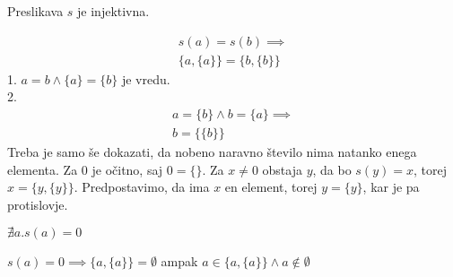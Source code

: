 \begin{trditev}
    Preslikava $s$ je injektivna.
\end{trditev}
\begin{dokaz}
    \begin{align*}
        s(a) = s(b) \implies \\
        \{a,\{a\}\} = \{b,\{b\}\}
    \end{align*}
    1. $a = b \wedge \{a\} = \{b\}$ je vredu. \\
    2.
    \begin{align*}
        a = \{b\} \wedge b = \{a\} \implies \\
        b = \{\{b\}\}
    \end{align*}
    Treba je samo še dokazati, da nobeno naravno število nima natanko enega elementa.
    Za $0$ je očitno, saj $0 = \{\}$.
    Za $x \neq 0$ obstaja $y$, da bo $s(y) = x$, torej $x = \{y, \{y\}\}$.
    Predpostavimo, da ima $x$ en element, torej $y = \{y\}$, kar je pa protislovje.
\end{dokaz}

\begin{trditev}
    $\nexists a. s(a) = 0$
\end{trditev}
\begin{dokaz}
    $s(a) = 0 \implies \{a, \{a\}\} = \emptyset$ ampak $a \in \{a, \{a\}\} \wedge a \notin \emptyset$
\end{dokaz}



